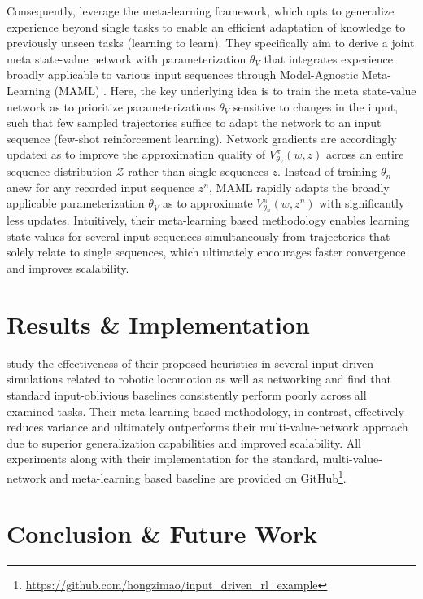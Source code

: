 Consequently, \citeauthor{mao2018variance} leverage the meta-learning framework, which opts to generalize  experience beyond single tasks to enable an efficient adaptation of knowledge to previously unseen tasks (learning to learn). They specifically aim to derive a joint meta state-value network with parameterization $\theta_V$ that integrates experience broadly applicable to various input sequences through Model-Agnostic Meta-Learning (MAML) \cite{finn2017model}. Here, the key underlying idea is to train the meta state-value network as to prioritize parameterizations $\theta_V$ sensitive to changes in the input, such that few sampled trajectories suffice to adapt the network to an input sequence (few-shot reinforcement learning). Network gradients are accordingly updated as to improve the approximation quality of $V^{\pi}_{\theta_V}(w,z)$ across an entire sequence distribution $\mathcal{Z}$ rather than single sequences $z$. Instead of training $\theta_n$ anew for any recorded input sequence $z^n$, MAML rapidly adapts the broadly applicable parameterization $\theta_V$ as to approximate $V^{\pi}_{\theta_n}(w,z^n)$ with significantly less updates. Intuitively, their meta-learning based methodology enables learning state-values for several input sequences simultaneously from trajectories that solely relate to single sequences, which ultimately encourages faster convergence and improves scalability.

\section{Results \& Implementation}

\citeauthor{mao2018variance} study the effectiveness of their proposed heuristics in several input-driven simulations related to robotic locomotion as well as networking and find that standard input-oblivious baselines consistently perform poorly across all examined tasks. Their meta-learning based methodology, in contrast, effectively reduces variance and ultimately outperforms their multi-value-network approach due to superior generalization capabilities and improved scalability. All experiments along with their implementation for the standard, multi-value-network and meta-learning based baseline are provided on GitHub\footnote{\url{https://github.com/hongzimao/input_driven_rl_example}}.


\section{Conclusion \& Future Work}

